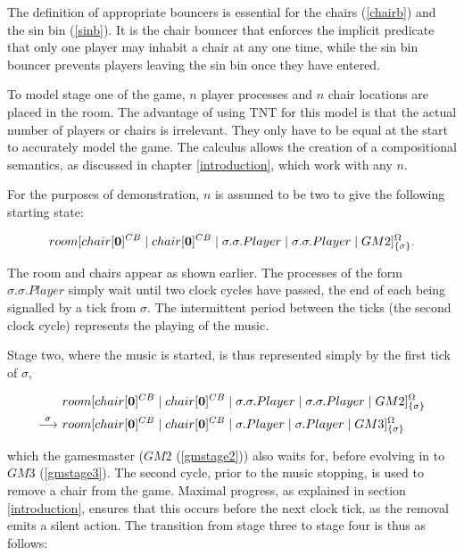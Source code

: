 The definition of appropriate bouncers is essential for the chairs
(\ref{chairb}) and the sin bin (\ref{sinb}).  It is the chair bouncer
that enforces the implicit predicate that only one player may inhabit a
chair at any one time, while the sin bin bouncer prevents players
leaving the sin bin once they have entered.

To model stage one of the game, $n$ player processes and $n$ chair
locations are placed in the room.  The advantage of using TNT for this
model is that the actual number of players or chairs is irrelevant.
They only have to be equal at the start to accurately model the game.
The calculus allows the creation of a compositional semantics, as
discussed in chapter \ref{introduction}, which work with any $n$.

For the purposes of demonstration, $n$ is assumed to be two to give the
following starting state:

\begin{equation}
  {room}[ {chair}[ \textbf{0} ]^{CB} \;|\; {chair}[ \textbf{0} ]^{CB} \;|\; 
   \sigma.\sigma.Player \;|\; \sigma.\sigma.Player \;|\; GM2 ]^{\Omega}_{\{\sigma\}}.
\end{equation}

\noindent The room and chairs appear as shown earlier.  The
processes of the form $\sigma.\sigma.Player$ simply wait until two clock
cycles have passed, the end of each being signalled by a tick from
$\sigma$.  The intermittent period between the ticks (the second clock
cycle) represents the playing of the music.  

Stage two, where the music is started, is thus represented simply by the
first tick of $\sigma$,

\begin{equation}
\begin{aligned}
  & {room}[ {chair}[ \textbf{0} ]^{CB} \;|\; {chair}[ \textbf{0} ]^{CB} \;|\; 
   \sigma.\sigma.Player \;|\; \sigma.\sigma.Player \;|\;
   GM2 ]^{\Omega}_{\{\sigma\}} \\
 \stackrel{\sigma}{\longrightarrow}\ & {room}[ {chair}[ \textbf{0} ]^{CB} \;|\; {chair}[ \textbf{0} ]^{CB} \;|\; 
   \sigma.Player \;|\; \sigma.Player \;|\;
   GM3 ]^{\Omega}_{\{\sigma\}}
\end{aligned}
\end{equation}

\noindent which the gamesmaster ($GM2$ (\ref{gmstage2})) also waits for,
before evolving in to $GM3$ (\ref{gmstage3}).  The second cycle, prior
to the music stopping, is used to remove a chair from the game.  Maximal
progress, as explained in section \ref{introduction}, ensures that this
occurs before the next clock tick, as the removal emits a silent action.
The transition from stage three to stage four is thus as follows:

